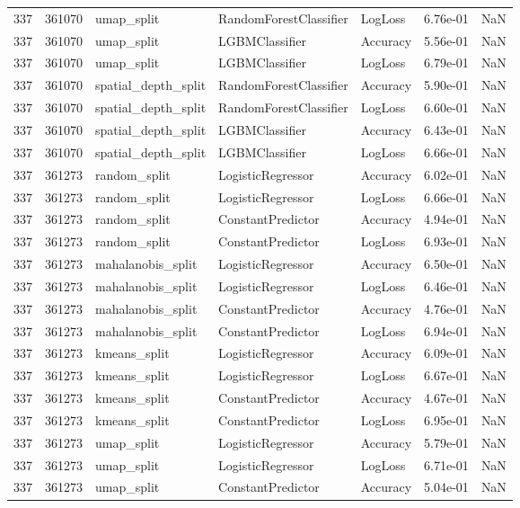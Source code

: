 \begin{tabular}{rrlllrr}
337 & 361070 & umap\_split & RandomForestClassifier & LogLoss & 6.76e-01 & NaN \\
337 & 361070 & umap\_split & LGBMClassifier & Accuracy & 5.56e-01 & NaN \\
337 & 361070 & umap\_split & LGBMClassifier & LogLoss & 6.79e-01 & NaN \\
337 & 361070 & spatial\_depth\_split & RandomForestClassifier & Accuracy & 5.90e-01 & NaN \\
337 & 361070 & spatial\_depth\_split & RandomForestClassifier & LogLoss & 6.60e-01 & NaN \\
337 & 361070 & spatial\_depth\_split & LGBMClassifier & Accuracy & 6.43e-01 & NaN \\
337 & 361070 & spatial\_depth\_split & LGBMClassifier & LogLoss & 6.66e-01 & NaN \\
337 & 361273 & random\_split & LogisticRegressor & Accuracy & 6.02e-01 & NaN \\
337 & 361273 & random\_split & LogisticRegressor & LogLoss & 6.66e-01 & NaN \\
337 & 361273 & random\_split & ConstantPredictor & Accuracy & 4.94e-01 & NaN \\
337 & 361273 & random\_split & ConstantPredictor & LogLoss & 6.93e-01 & NaN \\
337 & 361273 & mahalanobis\_split & LogisticRegressor & Accuracy & 6.50e-01 & NaN \\
337 & 361273 & mahalanobis\_split & LogisticRegressor & LogLoss & 6.46e-01 & NaN \\
337 & 361273 & mahalanobis\_split & ConstantPredictor & Accuracy & 4.76e-01 & NaN \\
337 & 361273 & mahalanobis\_split & ConstantPredictor & LogLoss & 6.94e-01 & NaN \\
337 & 361273 & kmeans\_split & LogisticRegressor & Accuracy & 6.09e-01 & NaN \\
337 & 361273 & kmeans\_split & LogisticRegressor & LogLoss & 6.67e-01 & NaN \\
337 & 361273 & kmeans\_split & ConstantPredictor & Accuracy & 4.67e-01 & NaN \\
337 & 361273 & kmeans\_split & ConstantPredictor & LogLoss & 6.95e-01 & NaN \\
337 & 361273 & umap\_split & LogisticRegressor & Accuracy & 5.79e-01 & NaN \\
337 & 361273 & umap\_split & LogisticRegressor & LogLoss & 6.71e-01 & NaN \\
337 & 361273 & umap\_split & ConstantPredictor & Accuracy & 5.04e-01 & NaN \\

\end{tabular}
